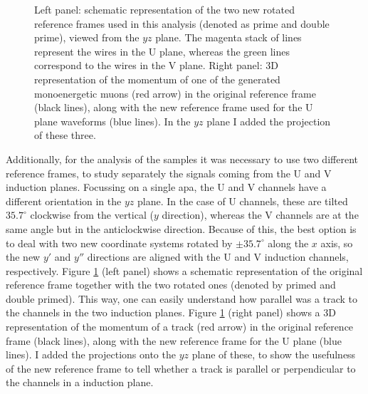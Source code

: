 \begin{figure}[t]
\begin{subfigure}{0.5\textwidth}
	\end{subfigure}
	\caption[Schematic representation of the two rotated reference frames used in the analysis of the \gls{mc} filter performance.]{Left panel: schematic representation of the two new rotated reference frames used in this analysis (denoted as prime and double prime), viewed from the $yz$ plane. The magenta stack of lines represent the wires in the U plane, whereas the green lines correspond to the wires in the V plane. Right panel: 3D representation of the momentum of one of the generated monoenergetic muons (red arrow) in the original reference frame (black lines), along with the new reference frame used for the U plane waveforms (blue lines). In the $yz$ plane I added the projection of these three.}
	\label{fig:reference_frame}
\end{figure}

Additionally, for the analysis of the samples it was necessary to use two different reference frames, to study separately the signals coming from the U and V induction planes. Focussing on a single \gls{apa}, the U and V channels have a different orientation in the $yz$ plane. In the case of U channels, these are tilted $35.7^{\circ}$ clockwise from the vertical ($y$ direction), whereas the V channels are at the same angle but in the anticlockwise direction. Because of this, the best option is to deal with two new coordinate systems rotated by $\pm 35.7^{\circ}$ along the $x$ axis, so the new $y'$ and $y''$ directions are aligned with the U and V induction channels, respectively. Figure \ref{fig:reference_frame} (left panel) shows a schematic representation of the original reference frame together with the two rotated ones (denoted by primed and double primed). This way, one can easily understand how parallel was a track to the channels in the two induction planes. Figure \ref{fig:reference_frame} (right panel) shows a 3D representation of the momentum of a track (red arrow) in the original reference frame (black lines), along with the new reference frame for the U plane (blue lines). I added the projections onto the $yz$ plane of these, to show the usefulness of the new reference frame to tell whether a track is parallel or perpendicular to the channels in a induction plane.

